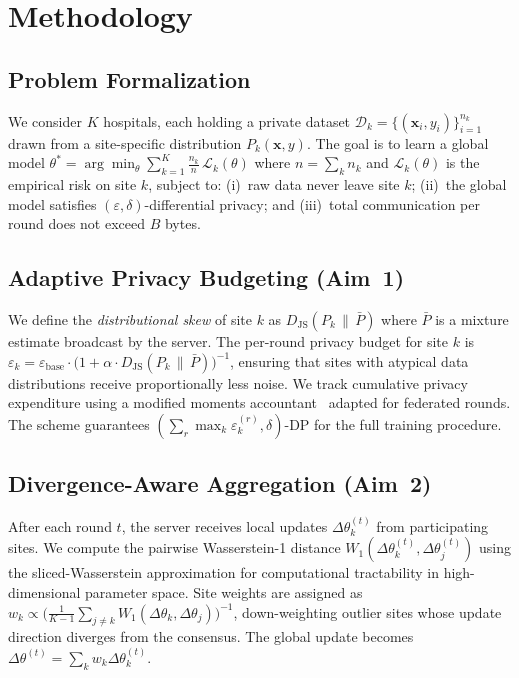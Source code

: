 \section{Methodology}

\subsection{Problem Formalization}

We consider $K$ hospitals, each holding a private dataset
$\mathcal{D}_k = \{(\mathbf{x}_i, y_i)\}_{i=1}^{n_k}$ drawn from a site-specific distribution
$P_k(\mathbf{x}, y)$. The goal is to learn a global model
$\theta^* = \arg\min_\theta \sum_{k=1}^{K} \frac{n_k}{n}\,\mathcal{L}_k(\theta)$ where
$n = \sum_k n_k$ and $\mathcal{L}_k(\theta)$ is the empirical risk on site $k$, subject to:
(i)~raw data never leave site $k$; (ii)~the global model satisfies
$(\varepsilon,\delta)$-differential privacy; and (iii)~total communication per round does
not exceed $B$ bytes.

\subsection{Adaptive Privacy Budgeting (Aim~1)}

We define the \emph{distributional skew} of site $k$ as
$D_{\mathrm{JS}}(P_k \,\|\, \bar{P})$ where $\bar{P}$ is a mixture estimate broadcast by the
server. The per-round privacy budget for site $k$ is
$\varepsilon_k = \varepsilon_{\mathrm{base}} \cdot \bigl(1 +
\alpha \cdot D_{\mathrm{JS}}(P_k \,\|\, \bar{P})\bigr)^{-1}$, ensuring that sites with
atypical data distributions receive proportionally less noise. We track cumulative privacy
expenditure using a modified moments accountant~\cite{abadi2016} adapted for federated
rounds. The scheme guarantees $(\sum_r \max_k \varepsilon_k^{(r)}, \delta)$-DP for the full
training procedure.

\subsection{Divergence-Aware Aggregation (Aim~2)}

After each round $t$, the server receives local updates $\Delta\theta_k^{(t)}$ from
participating sites. We compute the pairwise Wasserstein-1 distance
$W_1(\Delta\theta_k^{(t)}, \Delta\theta_j^{(t)})$ using the sliced-Wasserstein approximation
for computational tractability in high-dimensional parameter space. Site weights are
assigned as $w_k \propto \bigl(\frac{1}{K-1}\sum_{j \neq k} W_1(\Delta\theta_k,
\Delta\theta_j)\bigr)^{-1}$, down-weighting outlier sites whose update direction diverges
from the consensus. The global update becomes
$\Delta\theta^{(t)} = \sum_k w_k \Delta\theta_k^{(t)}$.

